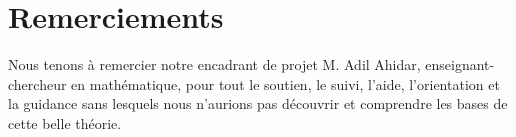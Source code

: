 \documentclass[
    8.2pt,
    a4paper,
    logo,
    twocolumn
]{template}
\begin{document}
    \section*{Remerciements}
    Nous tenons à remercier notre encadrant de projet M. Adil Ahidar, enseignant-chercheur en mathématique, pour tout le soutien, le suivi, l’aide, l’orientation et la guidance sans lesquels nous n’aurions pas découvrir et comprendre les bases de cette belle théorie.

\nocite{*}
\begin{footnotesize}
    
\end{footnotesize}
\end{document}
